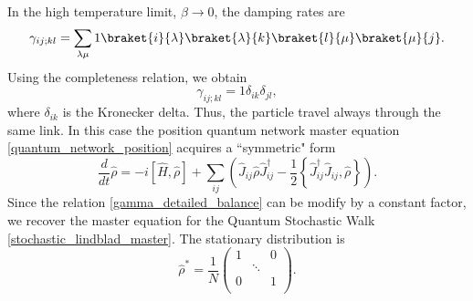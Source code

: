 In the high temperature limit, $\beta \rightarrow 0$, the damping rates are
\begin{equation}
    \gamma_{ij;kl}= \sum_{\lambda\mu} 1 \braket{i}{\lambda}\braket{\lambda}{k}\braket{l}{\mu}\braket{\mu}{j}.
\end{equation}
Using the completeness relation, we obtain
\begin{equation}
    \gamma_{ij;kl} = 1 \delta_{ik}\delta_{jl},
\end{equation}
where $\delta_{ik}$ is the Kronecker delta. Thus, the particle travel always through the same link.
In this case the position quantum network master equation \eqref{quantum_network_position} acquires a “symmetric" form
\begin{equation}
    \frac{d}{dt}\hat\rho = -i\left[\hat H,\hat\rho\right] +\sum_{ij}\left(\hat J_{ij}\hat\rho \hat J_{ij}^\dagger - \frac{1}{2}\left\{ \hat J_{ij}^\dagger\hat J_{ij}, \hat\rho\right\} \right).
\end{equation}
Since the relation \eqref{gamma_detailed_balance} can be modify by a constant factor, we recover the master equation for the Quantum Stochastic Walk \eqref{stochastic_lindblad_master}.
The stationary distribution is 
\begin{equation}
    \hat\rho^* = \frac{1}{N}\begin{pmatrix}
        1&&0\\
        &\ddots&\\
        0&&1\\
    \end{pmatrix}.
\end{equation}

